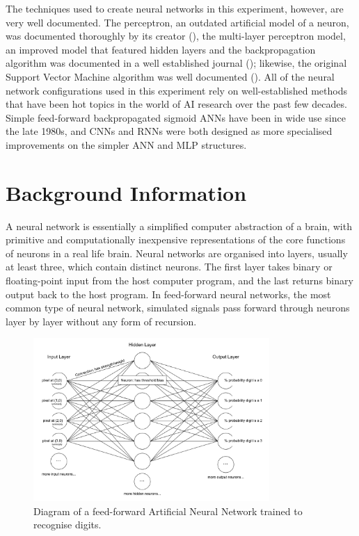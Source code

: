 \documentclass[]{report}
\begin{document}
The techniques used to create neural networks in this experiment, however, are very well documented. The perceptron, an outdated artificial model of a neuron, was documented thoroughly by its creator (\cite{rosenblatt1958perceptron}), the multi-layer perceptron model, an improved model that featured hidden layers and the backpropagation algorithm was documented in a well established journal (\cite{rumelhart1986learning}); likewise, the original Support Vector Machine algorithm was well documented (\cite{vapnik1995support}). All of the neural network configurations used in this experiment rely on well-established methods that have been hot topics in the world of AI research over the past few decades. Simple feed-forward backpropagated sigmoid ANNs have been in wide use since the late 1980s, and CNNs and RNNs were both designed as more specialised improvements on the simpler ANN and MLP structures.

\section{Background Information}

A neural network is essentially a simplified computer abstraction of a brain, with primitive and computationally inexpensive representations of the core functions of neurons in a real life brain. Neural networks are organised into layers, usually at least three, which contain distinct neurons. The first layer takes binary or floating-point input from the host computer program, and the last returns binary output back to the host program. In feed-forward neural networks, the most common type of neural network, simulated signals pass forward through neurons layer by layer without any form of recursion.

\begin{figure}[H]
	\centering
	\includegraphics[width=0.8\textwidth]{network.png}
	\caption{Diagram of a feed-forward Artificial Neural Network trained to recognise digits.}
	\label{fig:network}
\end{figure}
\end{document}
